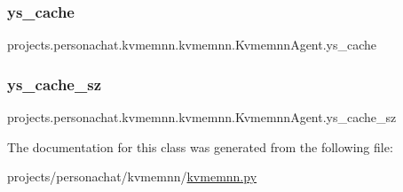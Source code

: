 \subsubsection{\texorpdfstring{ys\+\_\+cache}{ys\_cache}}
{\footnotesize\ttfamily projects.\+personachat.\+kvmemnn.\+kvmemnn.\+Kvmemnn\+Agent.\+ys\+\_\+cache}

\mbox{\label{classprojects_1_1personachat_1_1kvmemnn_1_1kvmemnn_1_1KvmemnnAgent_a9c5c9281c032bbe9e028230700e51006}} 
\subsubsection{\texorpdfstring{ys\+\_\+cache\+\_\+sz}{ys\_cache\_sz}}
{\footnotesize\ttfamily projects.\+personachat.\+kvmemnn.\+kvmemnn.\+Kvmemnn\+Agent.\+ys\+\_\+cache\+\_\+sz}



The documentation for this class was generated from the following file\+:\begin{DoxyCompactItemize}
\item 
projects/personachat/kvmemnn/\hyperlink{projects_2personachat_2kvmemnn_2kvmemnn_8py}{kvmemnn.\+py}\end{DoxyCompactItemize}
